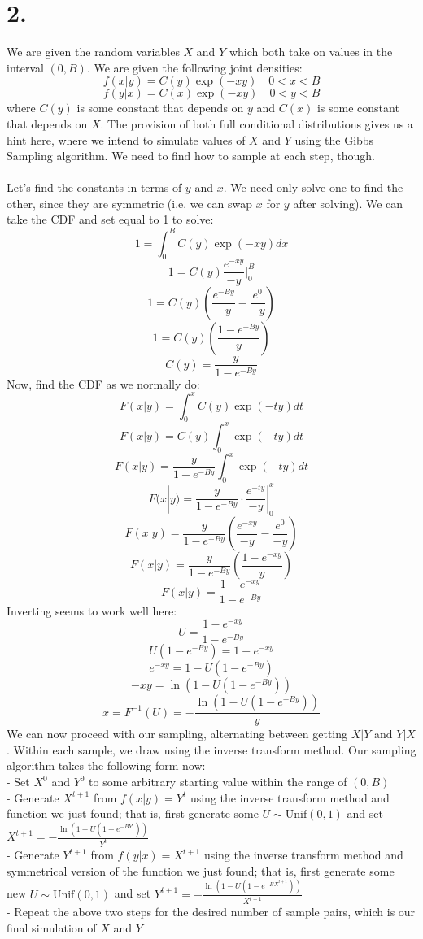\documentclass{article}
\begin{document}
{\Large 

\section*{2.}

We are given the random variables \(X\) and \(Y\) which both take on values in the interval \((0, B)\). We are given the following joint densities:
\[
  f(x | y) = C(y)\exp(-xy) \quad 0 < x < B
\]
\[
  f(y | x) = C(x)\exp(-xy) \quad 0 < y < B
\]
where \(C(y)\) is some constant that depends on \(y\) and \(C(x)\) is some constant that depends on \(X\). The provision of both full conditional distributions gives us a hint here, where we intend to simulate values of \(X\) and \(Y\) using the Gibbs Sampling algorithm. We need to find how to sample at each step, though. \\ \\ 
Let's find the constants in terms of \(y\) and \(x\). We need only solve one to find the other, since they are symmetric (i.e. we can swap \(x\) for \(y\) after solving). We can take the CDF and set equal to 1 to solve:
\[
  1 = \int_{0}^{B} C(y) \exp(-xy) dx
\]
\[
  1 = C(y) \frac{e^{-xy}}{-y} |_{0}^{B}
\]
\[
  1 = C(y) (\frac{e^{-By}}{-y} - \frac{e^{0}}{-y})
\]
\[
  1 = C(y) (\frac{1 - e^{-By}}{y})
\]
\[
  C(y) = \frac{y}{1 - e^{-By}}
\]
Now, find the CDF as we normally do:
\[
  F(x|y) = \int_0^x C(y) \exp(-ty) dt
\]
\[
  F(x|y) = C(y) \int_0^x \exp(-ty) dt
\]
\[
  F(x|y) = \frac{y}{1 - e^{-By}} \int_0^x \exp(-ty) dt
\]
\[
  F(x|y) = \frac{y}{1 - e^{-By}} \cdot \frac{e^{-ty}}{-y} |_0^x 
\]
\[
  F(x|y) = \frac{y}{1 - e^{-By}} (\frac{e^{-xy}}{-y} - \frac{e^{0}}{-y})
\]
\[
  F(x|y) = \frac{y}{1 - e^{-By}} (\frac{1 - e^{-xy}}{y})
\]
\[
  F(x|y) = \frac{1 - e^{-xy}}{1 - e^{-By}}
\]
Inverting seems to work well here:
\[
  U = \frac{1 - e^{-xy}}{1 - e^{-By}}
\]
\[
  U(1 - e^{-By}) = 1 - e^{-xy}
\]
\[
  e^{-xy} = 1 - U(1 - e^{-By})
\]
\[
  -xy = \ln(1 - U(1 - e^{-By}))
\]
\[
  x = F^{-1}(U) = -\frac{\ln(1 - U(1 - e^{-By}))}{y}
\]
We can now proceed with our sampling, alternating between getting \(X|Y\) and \(Y|X\). Within each sample, we draw using the inverse transform method. Our sampling algorithm takes the following form now: \\
- Set \(X^0\) and \(Y^0\) to some arbitrary starting value within the range of \((0, B)\) \\
- Generate \(X^{t+1}\) from \(f (x | y) = Y^t\) using the inverse transform method and function we just found; that is, first generate some \(U \sim \text{Unif}(0, 1)\) and set \(X^{t+1} = -\frac{\ln(1 - U(1 - e^{-BY^t}))}{Y^t} \) \\
- Generate \(Y^{t+1}\) from \(f (y | x) = X^{t+1}\) using the inverse transform method and symmetrical version of the function we just found; that is, first generate some new \(U \sim \text{Unif}(0, 1)\) and set \(Y^{t+1} = -\frac{\ln(1 - U(1 - e^{-BX^{t+1}}))}{X^{t+1}} \) \\
- Repeat the above two steps for the desired number of sample pairs, which is our final simulation of \(X\) and \(Y\)

}
\end{document}
